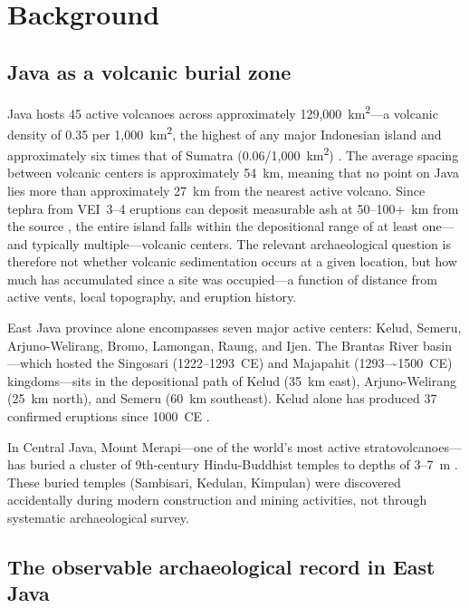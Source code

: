 \documentclass[12pt,a4paper]{article}
\begin{document}
\section{Background}

\subsection{Java as a volcanic burial zone}

Java hosts 45 active volcanoes across approximately 129,000~km\textsuperscript{2}---a volcanic density of 0.35 per 1,000~km\textsuperscript{2}, the highest of any major Indonesian island and approximately six times that of Sumatra (0.06/1,000~km\textsuperscript{2}) \citep{vanbemmelen1949}. The average spacing between volcanic centers is approximately 54~km, meaning that no point on Java lies more than approximately 27~km from the nearest active volcano. Since tephra from VEI~3--4 eruptions can deposit measurable ash at 50--100+~km from the source \citep{newhall1982}, the entire island falls within the depositional range of at least one---and typically multiple---volcanic centers. The relevant archaeological question is therefore not whether volcanic sedimentation occurs at a given location, but how much has accumulated since a site was occupied---a function of distance from active vents, local topography, and eruption history.

East Java province alone encompasses seven major active centers: Kelud, Semeru, Arjuno-Welirang, Bromo, Lamongan, Raung, and Ijen. The Brantas River basin---which hosted the Singosari (1222--1293~CE) and Majapahit (1293--\textasciitilde1500~CE) kingdoms---sits in the depositional path of Kelud (35~km east), Arjuno-Welirang (25~km north), and Semeru (60~km southeast). Kelud alone has produced 37 confirmed eruptions since 1000~CE \citep{gvp2024,maeno2019}.

In Central Java, Mount Merapi---one of the world's most active stratovolcanoes---has buried a cluster of 9th-century Hindu-Buddhist temples to depths of 3--7~m \citep{lavigne2000,thouret2000}. These buried temples (Sambisari, Kedulan, Kimpulan) were discovered accidentally during modern construction and mining activities, not through systematic archaeological survey.

\subsection{The observable archaeological record in East Java}
\end{document}
